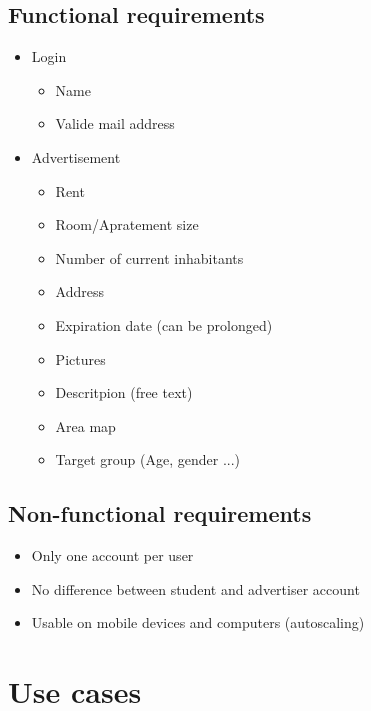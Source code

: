 \documentclass[a4paper,11pt]{article}
\begin{document}
\subsection*{Functional requirements}
\begin{itemize}
  \item Login
  \begin{itemize}
    \item Name
    \item Valide mail address
  \end{itemize}
  \item Advertisement
  \begin{itemize}
    \item Rent
    \item Room/Apratement size
    \item Number of current inhabitants
    \item Address
    \item Expiration date (can be prolonged)
    \item Pictures
    \item Descritpion (free text)
    \item Area map
    \item Target group (Age, gender ...)
  \end{itemize}
\end{itemize}
\subsection*{Non-functional requirements}
\begin{itemize}
  \item Only one account per user
  \item No difference between student and advertiser account
  \item Usable on mobile devices and computers (autoscaling)
\end{itemize}

\section{Use cases}
\end{document}
